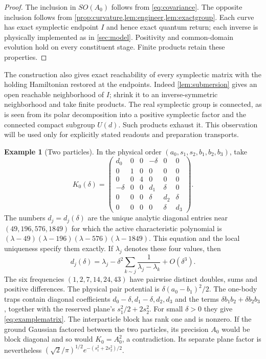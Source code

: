 \documentclass[11pt]{article}
\numberwithin{equation}{section}
\theoremstyle{definition}
\newtheorem{example}[example]{Example}
\begin{document}
\begin{proof}
The inclusion in $SO(A_0)$ follows from \eqref{eq:covariance}.
The opposite inclusion follows from
\cref{prop:curvature,lem:engineer,lem:exactgroup}.
Each curve has exact symplectic endpoint $I$ and
hence exact quantum return; each inverse is physically implemented
as in \cref{sec:model}. Positivity and common-domain evolution hold
on every constituent stage. Finite products retain these properties.
\end{proof}

The construction also gives exact reachability of every symplectic
matrix with the holding Hamiltonian restored at the endpoints.
Indeed \cref{lem:submersion} gives an open reachable neighborhood
of $I$; shrink it to an inverse-symmetric neighborhood and take
finite products. The real symplectic group is connected, as is seen
from its polar decomposition into a positive symplectic factor and
the connected compact subgroup $U(d)$. Such products exhaust it.
This observation will be used only for explicitly stated readouts
and preparation transports.

\begin{example}[Two particles]\label{ex:two}
In the physical order $(a_0,s_1,s_2,b_1,b_2,b_3)$, take
\begin{equation}\label{eq:examplematrix}
 K_0(\delta)=
 \begin{pmatrix}
 d_0&0&0&-\delta&0&0\\
 0&1&0&0&0&0\\
 0&0&4&0&0&0\\
 -\delta&0&0&d_1&\delta&0\\
 0&0&0&\delta&d_2&\delta\\
 0&0&0&0&\delta&d_3
 \end{pmatrix}.
\end{equation}
The numbers $d_j=d_j(\delta)$ are the unique analytic diagonal
entries near $(49,196,576,1849)$ for which the active characteristic
polynomial is
$(\lambda-49)(\lambda-196)(\lambda-576)(\lambda-1849)$.
This equation and the local uniqueness specify them exactly.
If $\lambda_j$ denotes these four values, then
\[
 d_j(\delta)=\lambda_j-
       \delta^2\sum_{k\sim j}\frac1{\lambda_j-\lambda_k}
       +O(\delta^3).
 \]
The six frequencies $(1,2,7,14,24,43)$ have pairwise distinct
doubles, sums and positive differences. The physical pair
potential is $\delta(a_0-b_1)^2/2$. The one-body traps contain
diagonal coefficients $d_0-\delta,d_1-\delta,d_2,d_3$ and the
terms $\delta b_1b_2+\delta b_2b_3$, together with the
reserved plane's $s_1^2/2+2s_2^2$.
For small $\delta>0$ they give \eqref{eq:examplematrix}.
The interparticle block has rank one and is nonzero. If the
ground Gaussian factored between the two particles, its precision
$A_0$ would be block diagonal and so would $K_0=A_0^2$, a
contradiction. Its separate plane factor is nevertheless
$(\sqrt2/\pi)^{1/2}e^{-(s_1^2+2s_2^2)/2}$.
\end{example}
\end{document}
